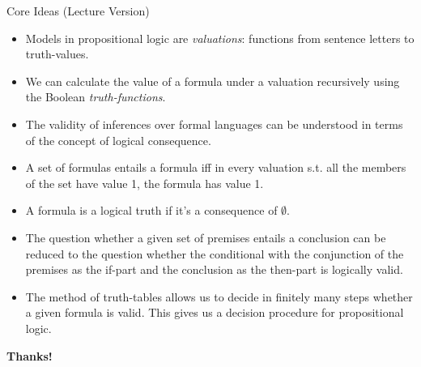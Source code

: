 \documentclass[../slides.tex]{subfiles}
\begin{document}
\begin{frame}{Core Ideas (Lecture Version)}
 
\begin{itemize}

	\item Models in propositional logic are \emph{valuations}: functions from sentence letters to truth-values.
	
	\item We can calculate the value of a formula under a valuation recursively using the Boolean \emph{truth-functions}.
	
	\item The validity of inferences over formal languages can be understood in terms of the concept of logical consequence.
	
	\item A set of formulas entails a formula iff in every valuation s.t. all the members of the set have value 1, the formula has value 1.
	
	\item A formula is a logical truth if it's a consequence of $\emptyset$.
	
	\item The question whether a given set of premises entails a conclusion can be reduced to the question whether the conditional with the conjunction of the premises as the if-part and the conclusion as the then-part is logically valid.
		
	\item The method of truth-tables allows us to decide in finitely many steps whether a given formula is valid. This gives us a decision procedure for propositional logic.
	
	
\end{itemize}


\end{frame}


\begin{frame}

	\begin{center}
	{\huge\bf Thanks!}
	\end{center}

\end{frame}
\end{document}

